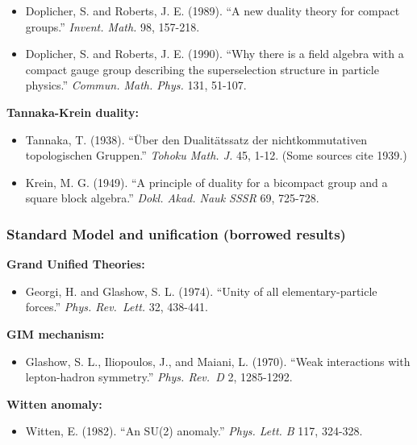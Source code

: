 \documentclass[11pt,a4paper]{article}
\theoremstyle{remark}
\providecommand{\tightlist}{%
  \setlength{\itemsep}{0pt}\setlength{\parskip}{0pt}}
\begin{document}
\begin{itemize}
\tightlist
\item
  Doplicher, S. and Roberts, J. E. (1989). ``A new duality theory for compact
  groups.'' \emph{Invent. Math.} 98, 157-218.
\item
  Doplicher, S. and Roberts, J. E. (1990). ``Why there is a field algebra with
  a compact gauge group describing the superselection structure in particle
  physics.'' \emph{Commun. Math. Phys.} 131, 51-107.
\end{itemize}

\textbf{Tannaka-Krein duality:}

\begin{itemize}
\tightlist
\item
  Tannaka, T. (1938). ``Über den Dualitätssatz der nichtkommutativen
  topologischen Gruppen.'' \emph{Tohoku Math. J.} 45, 1-12. (Some sources cite 1939.)
\item
  Krein, M. G. (1949). ``A principle of duality for a bicompact group and a
  square block algebra.'' \emph{Dokl. Akad. Nauk SSSR} 69, 725-728.
\end{itemize}

\subsubsection{Standard Model and unification (borrowed results)}\label{standard-model-and-unification-borrowed-results}

\textbf{Grand Unified Theories:}

\begin{itemize}
\tightlist
\item
  Georgi, H. and Glashow, S. L. (1974). ``Unity of all elementary-particle
  forces.'' \emph{Phys. Rev.~Lett.} 32, 438-441.
\end{itemize}

\textbf{GIM mechanism:}

\begin{itemize}
\tightlist
\item
  Glashow, S. L., Iliopoulos, J., and Maiani, L. (1970). ``Weak interactions
  with lepton-hadron symmetry.'' \emph{Phys. Rev.~D} 2, 1285-1292.
\end{itemize}

\textbf{Witten anomaly:}

\begin{itemize}
\tightlist
\item
  Witten, E. (1982). ``An SU(2) anomaly.'' \emph{Phys. Lett. B} 117, 324-328.
\end{itemize}
\end{document}
